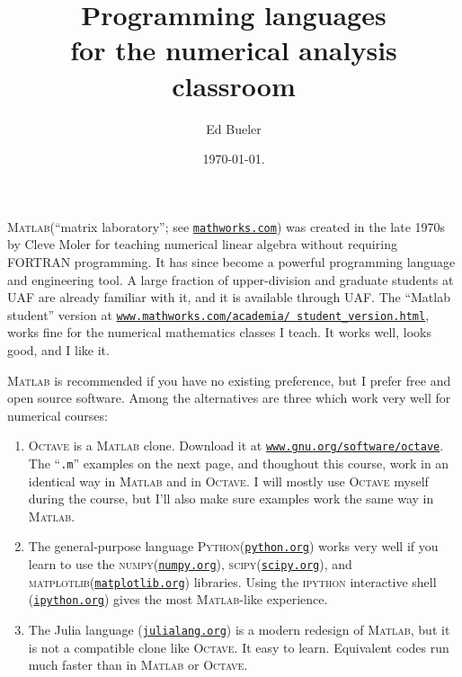 \documentclass[11pt]{amsart}
\newcommand{\Matlab}{\textsc{Matlab}\xspace}
\newcommand{\Octave}{\textsc{Octave}\xspace}
\newcommand{\Python}{\textsc{Python}\xspace}
\newcommand{\numpy}{\textsc{numpy}\xspace}
\newcommand{\scipy}{\textsc{scipy}\xspace}
\newcommand{\matplotlib}{\textsc{matplotlib}\xspace}
\begin{document}
\title{Programming languages \\ for the numerical analysis classroom}

\author{Ed Bueler}

\date{\today.}

\maketitle
\normalsize
\thispagestyle{empty}

\newcommand{\hrf}[2]{\href{#1}{\texttt{#2}}}

\Matlab (``matrix laboratory''; see \hrf{http://www.mathworks.com/}{mathworks.com}) was created in the late 1970s by Cleve Moler for teaching numerical linear algebra without requiring FORTRAN programming.  It has since become a powerful programming language and engineering tool.  A large fraction of upper-division and graduate students at UAF are already familiar with it, and it is available through UAF.  The ``Matlab student'' version at \hrf{https://www.mathworks.com/academia/student_version.html}{\texttt{www.mathworks.com/academia/ student\_version.html}}, works fine for the numerical mathematics classes I teach.  It works well, looks good, and I like it.

\Matlab is recommended if you have no existing preference, but I prefer free and open source software.  Among the alternatives are three which work very well for numerical courses:
\renewcommand{\labelenumi}{\arabic{enumi}.}
\begin{enumerate}
\item \Octave is a \Matlab clone.  Download it at
\hrf{http://www.gnu.org/software/octave/}{www.gnu.org/software/octave}.  The ``\texttt{.m}'' examples on the next page, and thoughout this course, work in an identical way in \Matlab and in \Octave.  I will mostly use \Octave myself during the course, but I'll also make sure examples work the same way in \Matlab.
\item The general-purpose language \Python (\hrf{http://python.org/}{python.org}) works very well if you learn to use the \numpy (\hrf{https://numpy.org/}{numpy.org}), \scipy (\hrf{http://www.scipy.org/}{scipy.org}), and \matplotlib (\hrf{http://matplotlib.org/}{matplotlib.org}) libraries.  Using the \textsc{ipython} interactive shell (\hrf{http://ipython.org/}{ipython.org}) gives the most \Matlab-like experience.
\item The Julia language (\hrf{https://julialang.org/}{julialang.org}) is a modern redesign of \Matlab, but it is not a compatible clone like \Octave.  It easy to learn.  Equivalent codes run much faster than in \Matlab or \Octave.
\end{enumerate}
\end{document}
